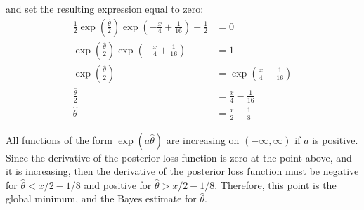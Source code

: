 \documentclass{article}
\begin{document}
and set the resulting expression equal to zero: 
\begin{align*}
\frac{1}{2}\exp\left(\frac{\hat{\theta}}{2}\right)\exp\left(-\frac{x}{4}+\frac{1}{16}\right) - \frac{1}{2} &= 0 \\
\exp\left(\frac{\hat{\theta}}{2}\right)\exp\left(-\frac{x}{4}+\frac{1}{16}\right) &= 1 \\ 
\exp\left(\frac{\hat{\theta}}{2}\right) &= \exp\left(\frac{x}{4}-\frac{1}{16}\right) \\
\frac{\hat{\theta}}{2} &= \frac{x}{4}-\frac{1}{16} \\
\hat{\theta} &= \frac{x}{2}-\frac{1}{8}
\end{align*}
\pagebreak

All functions of the form $\exp(a\hat{\theta})$ are increasing on $(-\infty, \infty)$ if $a$ is positive. Since the derivative of the posterior loss function is zero at the point above, and it is increasing, then the derivative of the posterior loss function must be negative for $\hat{\theta} < x/2-1/8$ and positive for $\hat{\theta} > x/2-1/8$. Therefore, this point is the global minimum, and the Bayes estimate for $\hat{\theta}$. 
\end{document}
